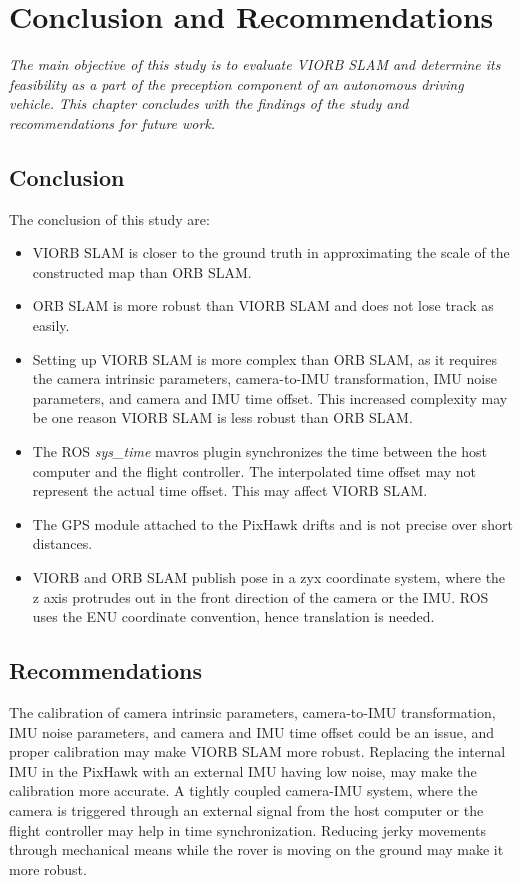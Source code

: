 \setlength{\footskip}{8mm}

\chapter{Conclusion and Recommendations}
\label{ch:conclusion}

\textit{The main objective of this study is to evaluate VIORB SLAM and determine its feasibility as a part of the preception component of an autonomous driving vehicle. This chapter concludes with the findings of the study and recommendations for future work.}

\section{Conclusion}
The conclusion of this study are:
\begin{itemize}
	\item VIORB SLAM is closer to the ground truth in approximating the scale of the constructed map than ORB SLAM.
	\item ORB SLAM is more robust than VIORB SLAM and does not lose track as easily.
	\item Setting up VIORB SLAM is more complex than ORB SLAM, as it requires the camera intrinsic parameters, camera-to-IMU transformation, IMU noise parameters, and camera and IMU time offset. This increased complexity may be one reason VIORB SLAM is less robust than ORB SLAM.
	\item The ROS \textit{sys\_time} mavros plugin synchronizes the time between the host computer and the flight controller. The interpolated time offset may not represent the actual time offset. This may affect VIORB SLAM.
	\item The GPS module attached to the PixHawk drifts and is not precise over short distances.
	\item VIORB and ORB SLAM publish pose in a zyx coordinate system, where the z axis protrudes out in the front direction of the camera or the IMU. ROS uses the ENU coordinate convention, hence translation is needed. 
\end{itemize}

\section{Recommendations}
The calibration of camera intrinsic parameters, camera-to-IMU transformation, IMU noise parameters, and camera and IMU time offset could be an issue, and proper calibration may make VIORB SLAM more robust. Replacing the internal IMU in the PixHawk with an external IMU having low noise, may make the calibration more accurate. A tightly coupled camera-IMU system, where the camera is triggered through an external signal from the host computer or the flight controller may help in time synchronization. Reducing jerky movements through mechanical means while the rover is moving on the ground may make it more robust.
\FloatBarrier

